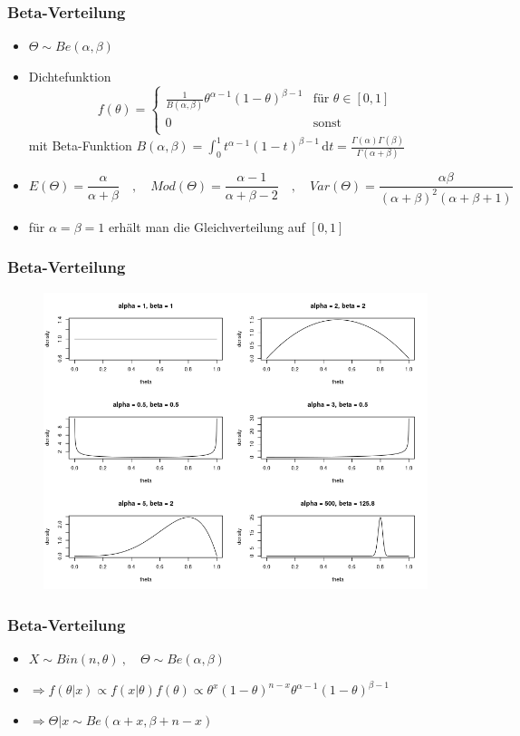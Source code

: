 \documentclass[aspectratio=169,xcolor=dvipsnames]{beamer}
\begin{document}
\begin{frame}
\frametitle{Beta-Verteilung}
\begin{itemize}
	\item<1-> $\Theta \sim Be(\alpha,\beta)$
	\item<2-> Dichtefunktion $$f(\theta)=\left\{\begin{array}{ll}
	\frac{1}{B(\alpha,\beta)}\theta^{\alpha -1}(1-\theta)^{\beta -1} & \text{für }\theta\in[0,1]\\
	0 & \text{sonst}\\
	\end{array}\right.$$
	mit Beta-Funktion $B(\alpha,\beta)=\int_0^1t^{\alpha-1}(1-t)^{\beta-1}\,\text{d}t = \frac{\Gamma(\alpha)\Gamma(\beta)}{\Gamma(\alpha+\beta)}$
	\item<3-> $$E(\Theta) = \frac{\alpha}{\alpha+\beta}\quad,\quad Mod(\Theta)=\frac{\alpha-1}{\alpha+\beta-2}\quad,\quad Var(\Theta)=\frac{\alpha\beta}{(\alpha+\beta)^2(\alpha+\beta+1)}$$
	\item<4-> für $\alpha=\beta=1$ erhält man die Gleichverteilung auf $[0,1]$
\end{itemize}
\end{frame}

\begin{frame}
\frametitle{Beta-Verteilung}
\begin{figure}
	\includegraphics[height=0.85\textheight]{betaDistribution}
\end{figure}
\end{frame}

\begin{frame}
\frametitle{Beta-Verteilung}
\begin{itemize}
	\item<1-> $X\sim Bin(n,\theta)~,\quad \Theta\sim Be(\alpha,\beta)$
	\item<2-> $\Rightarrow f(\theta|x)\propto f(x|\theta)f(\theta)\propto \theta^x(1-\theta)^{n-x}\theta^{\alpha-1}(1-\theta)^{\beta-1}$
	\item<3-> $\Rightarrow \Theta|x \sim Be(\alpha+x,\beta+n-x)$
\end{itemize}
\end{frame}
\end{document}
